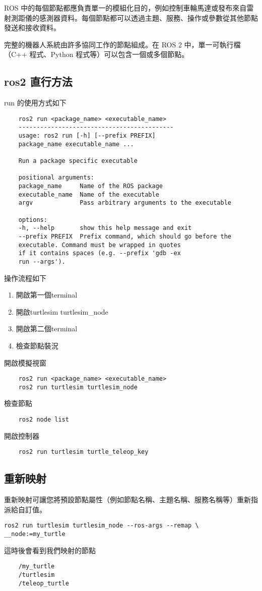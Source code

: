 ROS 中的每個節點都應負責單一的模組化目的，例如控制車輪馬達或發布來自雷射測距儀的感測器資料。每個節點都可以透過主題、服務、操作或參數從其他節點發送和接收資料。

完整的機器人系統由許多協同工作的節點組成。在 ROS 2 中，單一可執行檔（C++ 程式、Python 程式等）可以包含一個或多個節點。

\subsection{ros2 直行方法}
run 的使用方式如下
\begin{verbatim}
    ros2 run <package_name> <executable_name>
    -------------------------------------------
    usage: ros2 run [-h] [--prefix PREFIX]
    package_name executable_name ...

    Run a package specific executable

    positional arguments:
    package_name     Name of the ROS package
    executable_name  Name of the executable
    argv             Pass arbitrary arguments to the executable

    options:
    -h, --help       show this help message and exit
    --prefix PREFIX  Prefix command, which should go before the
    executable. Command must be wrapped in quotes
    if it contains spaces (e.g. --prefix 'gdb -ex
    run --args').
\end{verbatim}
操作流程如下
\begin{enumerate}
    \item 開啟第一個terminal
    \item 開啟turtlesim turtlesim\_node
    \item 開啟第二個terminal
    \item 檢查節點裝況
\end{enumerate}
開啟模擬視窗
\begin{verbatim}
    ros2 run <package_name> <executable_name>
    ros2 run turtlesim turtlesim_node
\end{verbatim}

檢查節點
\begin{verbatim}
    ros2 node list
\end{verbatim}
開啟控制器
\begin{verbatim}
    ros2 run turtlesim turtle_teleop_key
\end{verbatim}
\subsection{重新映射}
重新映射可讓您將預設節點屬性（例如節點名稱、主題名稱、服務名稱等）重新指派給自訂值。
\begin{verbatim}
ros2 run turtlesim turtlesim_node --ros-args --remap \
__node:=my_turtle
\end{verbatim}
這時後會看到我們映射的節點
\begin{verbatim}
    /my_turtle
    /turtlesim
    /teleop_turtle
\end{verbatim}

